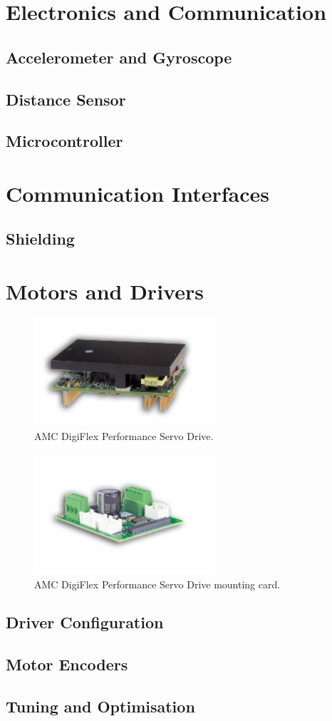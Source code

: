 \section{Electronics and Communication}
\subsection{Accelerometer and Gyroscope}
\subsection{Distance Sensor}
\subsection{Microcontroller}
\section{Communication Interfaces}
\subsection{Shielding}
\section{Motors and Drivers}

\begin{figure}
\centering
\includegraphics[width=0.6\textwidth]{images/driver/driver.jpg} 
\caption{AMC DigiFlex Performance Servo Drive.}
\label{fig:AMC Servo Drive}
\end{figure}

\begin{figure}
\centering
\includegraphics[width=0.6\textwidth]{images/driver/mounting-card.jpg} 
\caption{AMC DigiFlex Performance Servo Drive mounting card.}
\label{fig:AMC Servo Drive Mounting Card}
\end{figure}

\subsection{Driver Configuration}
\subsection{Motor Encoders}
\subsection{Tuning and Optimisation}
